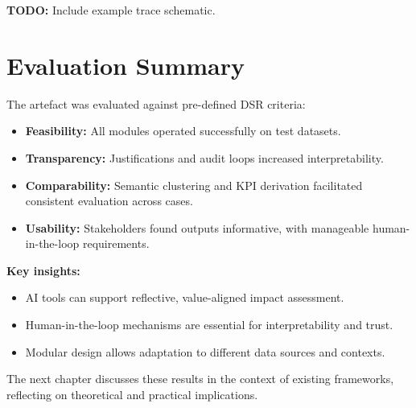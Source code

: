 \textbf{TODO:} Include example trace schematic.

\section{Evaluation Summary}\label{sec:results-summary}

The artefact was evaluated against pre-defined DSR criteria:

\begin{itemize}
    \item \textbf{Feasibility:} All modules operated successfully on test datasets.  
    \item \textbf{Transparency:} Justifications and audit loops increased interpretability.  
    \item \textbf{Comparability:} Semantic clustering and KPI derivation facilitated consistent evaluation across cases.  
    \item \textbf{Usability:} Stakeholders found outputs informative, with manageable human-in-the-loop requirements.  
\end{itemize}

\textbf{Key insights:}  

\begin{itemize}
    \item AI tools can support reflective, value-aligned impact assessment.  
    \item Human-in-the-loop mechanisms are essential for interpretability and trust.  
    \item Modular design allows adaptation to different data sources and contexts.  
\end{itemize}

The next chapter discusses these results in the context of existing frameworks, reflecting on theoretical and practical implications.